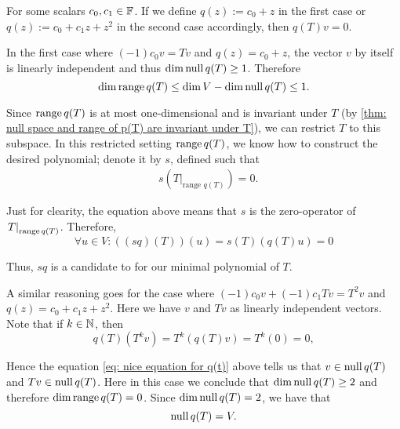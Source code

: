 \begin{prf}
  For some scalars $c_0, c_1 \in  \mathbb{F}$. If we define $q(z) := c_0+z$ in the first case or $q(z) := c_0+c_1z+z^2$ in the second case accordingly, then $q(T)v=0$.

  In the first case where $(-1)c_0v=Tv$ and $q(z)=c_0+z$, the vector $v$ by itself is linearly independent and thus $\dim \operatorname{null} q(T) \geq 1$.  Therefore
  \begin{equation}
    \dim \operatorname{range} q(T) \leq \dim V - \dim \operatorname{null} q(T) \leq 1.
  \end{equation}

  Since $\operatorname{range} q(T)$ is at most one-dimensional and is invariant under $T$ (by \ref{thm: null space and range of p(T) are invariant under T}), we can restrict $T$ to this subspace. In this restricted setting $\operatorname{range} q(T)$, we know how to construct the desired polynomial; denote it by $s$, defined such that
  \begin{equation}
    \begin{aligned}
        &s \left(\left. T \right |_{\text{range $q(T)$}} \right)=0.
    \end{aligned}
  \end{equation}

  Just for clearity, the equation above means that $s$ is the zero-operator of $\left. T \right |_{\operatorname{range} q(T)}$. Therefore,
  \begin{equation}
    \forall u \in V: \left((sq)(T)\right)(u) = s(T)(q(T)u)=0
  \end{equation}

  Thus, $sq$ is a candidate to for our minimal polynomial of $T$.

  A similar reasoning goes for the case where $(-1)c_0v+(-1)c_1Tv=T^2v$ and $q(z) = c_0+c_1z+z^2.$
  Here we have $v$ and $Tv$ as linearly independent vectors. Note that if $k \in \mathbb{N}$, then
  \begin{equation}
    \label{eq: nice equation for q(t)}
    q(T)(T^kv)=T^k(q(T)v) =T^k (0) =0,
  \end{equation}

  Hence the equation \eqref{eq: nice equation for q(t)} above tells us that $v\in \operatorname{null} q(T)$ and $Tv \in \operatorname{null} q(T)$. Here in this case we conclude that $\dim \operatorname{null} q(T) \geq 2$ and therefore $\dim \operatorname{range} q(T) = 0$.   Since $\dim \operatorname{null} q(T) = 2$, we have that
  \begin{equation}
    \operatorname{null} q(T) = V.
  \end{equation}


\end{prf}
